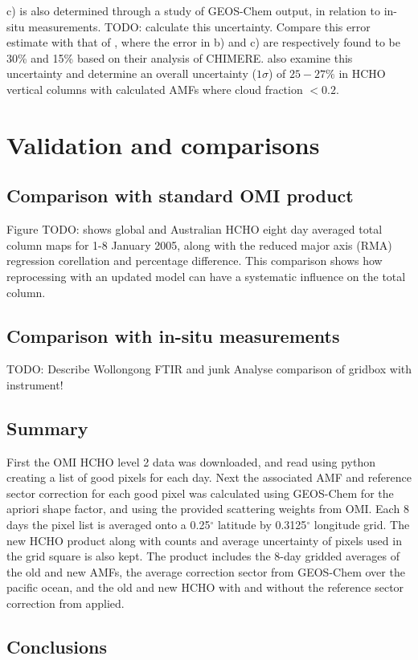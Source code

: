     c) is also determined through a study of GEOS-Chem output, in relation to in-situ measurements.
    TODO: calculate this uncertainty.
    Compare this error estimate with that of \citet{Curci2010}, where the error in b) and c) are respectively found to be 30\% and 15\% based on their analysis of CHIMERE.
    \cite{Millet2008} also examine this uncertainty and determine an overall uncertainty ($1\sigma$) of $25-27\%$ in HCHO vertical columns with calculated AMFs where cloud fraction $< 0.2$.
  
\section{Validation and comparisons}
  \label{ch_HCHO:sec:Validation}
  
  \subsection{Comparison with standard OMI product}
    Figure TODO: shows global and Australian HCHO eight day averaged total column maps for 1-8 January 2005, along with the reduced major axis (RMA) regression corellation and percentage difference.
   This comparison shows how reprocessing with an updated model can have a systematic influence on the total column.
  
  \subsection{Comparison with in-situ measurements}
    TODO: Describe Wollongong FTIR and junk
    Analyse comparison of gridbox with instrument!

  \subsection{Summary}
    First the OMI HCHO level 2 data was downloaded, and read using python creating a list of good pixels for each day.
    Next the associated AMF and reference sector correction for each good pixel was calculated using GEOS-Chem for the apriori shape factor, and using the provided scattering weights from OMI.
    Each 8 days the pixel list is averaged onto a 0.25$^{\circ}$ latitude by 0.3125$^{\circ}$ longitude grid.
    The new HCHO product along with counts and average uncertainty of pixels used in the grid square is also kept.
    The product includes the 8-day gridded averages of the old and new AMFs, the average correction sector from GEOS-Chem over the pacific ocean, and the old and new HCHO with and without the reference sector correction from \cite{Abad2015} applied.
    
    \subsection{Conclusions}
